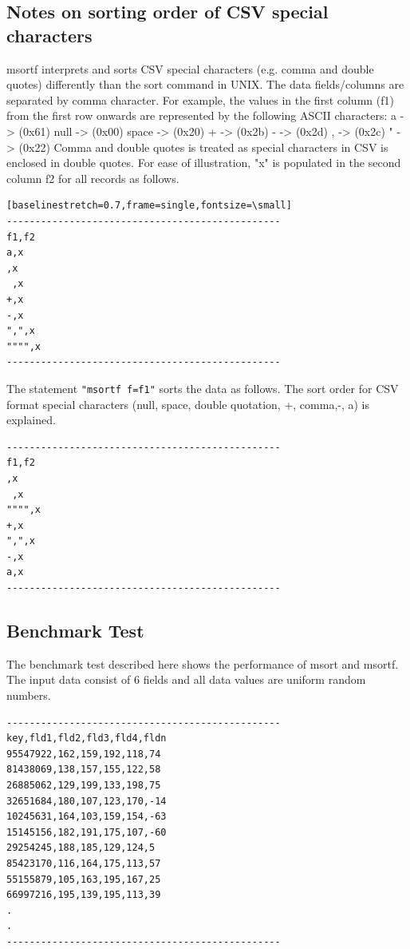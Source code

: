 \subsection*{Notes on sorting order of CSV special characters}
msortf interprets and sorts CSV special characters (e.g. comma and double quotes) differently than the sort command in UNIX. The data fields/columns are separated by comma character. For example, the values in the first column (f1) from the first row onwards are represented by the following ASCII characters: 
a -> (0x61)
null -> (0x00)
space -> (0x20)
+ -> (0x2b)
- -> (0x2d)
, -> (0x2c) 
" -> (0x22)
Comma and double quotes is treated as special characters in CSV is enclosed in double quotes. 
For ease of illustration, "x" is populated in the second column f2 for all records as follows. \\

\begin{verbatim}[baselinestretch=0.7,frame=single,fontsize=\small]
------------------------------------------------
f1,f2
a,x
,x
 ,x
+,x
-,x
",",x
"""",x
------------------------------------------------
\end{verbatim}

The statement \verb|"msortf f=f1"| sorts the data as follows.  The sort order for CSV format special characters (null, space, double quotation, +, comma,-, a) is explained. 

\begin{verbatim}
------------------------------------------------
f1,f2
,x
 ,x
"""",x
+,x
",",x
-,x
a,x
------------------------------------------------
\end{verbatim}

\subsection*{Benchmark Test}
The benchmark test described here shows the performance of msort and msortf. 
The input data consist of 6 fields and all data values are uniform random numbers. \\

\begin{verbatim}
------------------------------------------------
key,fld1,fld2,fld3,fld4,fldn
95547922,162,159,192,118,74
81438069,138,157,155,122,58
26885062,129,199,133,198,75
32651684,180,107,123,170,-14
10245631,164,103,159,154,-63
15145156,182,191,175,107,-60
29254245,188,185,129,124,5
85423170,116,164,175,113,57
55155879,105,163,195,167,25
66997216,195,139,195,113,39
.
.
------------------------------------------------
\end{verbatim}

